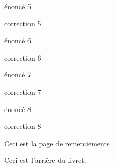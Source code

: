 \documentclass{classe-tex3R}
\begin{document}

\begin{enonce}
  énoncé 5
\end{enonce}

\begin{correction}
  correction 5
\end{correction}


\begin{enonce}
  énoncé 6
\end{enonce}

\begin{correction}
  correction 6
\end{correction}


\begin{enonce}
  énoncé 7
\end{enonce}

\begin{correction}
  correction 7
\end{correction}


\begin{enonce}
  énoncé 8 
\end{enonce}

\begin{correction}
  correction 8
\end{correction}


\begin{enonce}
  Ceci est la page de remerciements
\end{enonce}

\begin{correction}
  Ceci est l'arrière du livret.
\end{correction}
\end{document}
